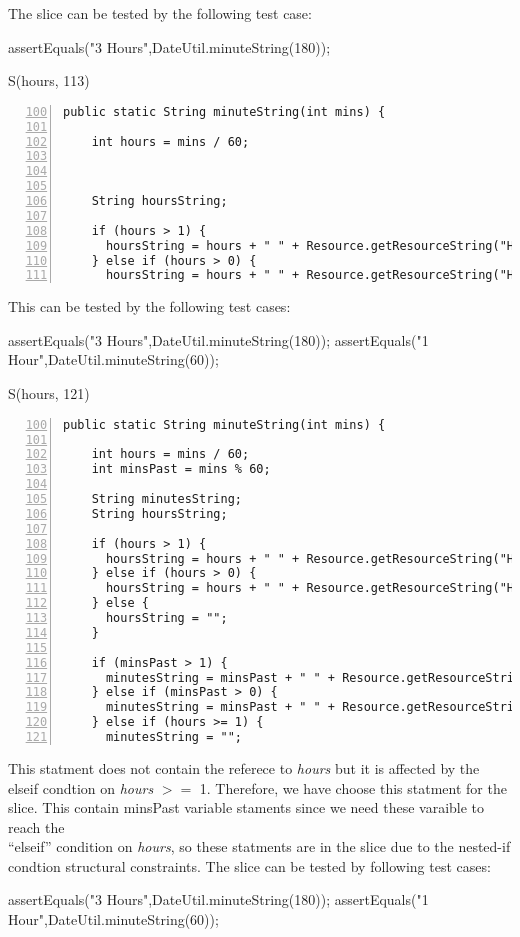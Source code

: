 \documentclass[fontsize=12pt,paper=letter,twoside]{scrartcl}
\begin{document}
The slice can be tested by the following test case:
\begin{code}
assertEquals("3 Hours",DateUtil.minuteString(180));
\end{code}

\hfill \break
\hfill \break

S(hours, 113)
\begin{lstlisting}[numbers=left,firstnumber=100]
  public static String minuteString(int mins) {
    
    int hours = mins / 60;

    

    String hoursString;
    
    if (hours > 1) {
      hoursString = hours + " " + Resource.getResourceString("Hours");
    } else if (hours > 0) {
      hoursString = hours + " " + Resource.getResourceString("Hour");
\end{lstlisting}

This can be tested by the following test cases:
\begin{code}
assertEquals("3 Hours",DateUtil.minuteString(180));
assertEquals("1 Hour",DateUtil.minuteString(60));
\end{code}

S(hours, 121)
\begin{lstlisting}[numbers=left,firstnumber=100]
  public static String minuteString(int mins) {
    
    int hours = mins / 60;
    int minsPast = mins % 60;
    
    String minutesString;
    String hoursString;
    
    if (hours > 1) {
      hoursString = hours + " " + Resource.getResourceString("Hours");
    } else if (hours > 0) {
      hoursString = hours + " " + Resource.getResourceString("Hour");
    } else {
      hoursString = "";
    }

    if (minsPast > 1) {
      minutesString = minsPast + " " + Resource.getResourceString("Minutes");
    } else if (minsPast > 0) {
      minutesString = minsPast + " " + Resource.getResourceString("Minute");
    } else if (hours >= 1) {
      minutesString = "";
\end{lstlisting}

This statment does not contain the referece to \emph{hours} but it is affected by the elseif condtion on \emph{hours} $>=$ 1. Therefore, we have choose this statment for the slice. This contain minsPast variable staments since we need these varaible to reach the \\ ``elseif'' condition on \emph{hours}, so these statments are in the slice due to the nested-if condtion structural constraints. The slice can be tested by following test cases:
\begin{code}
assertEquals("3 Hours",DateUtil.minuteString(180));
assertEquals("1 Hour",DateUtil.minuteString(60));
\end{code}
\end{document}
